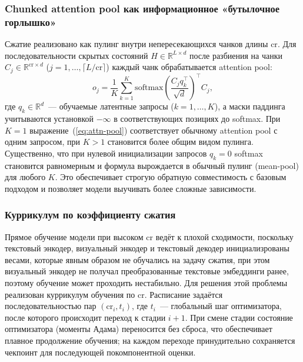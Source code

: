 \documentclass[a4paper,12pt]{extarticle}
\begin{document}
\subsubsection{Chunked attention pool как информационное «бутылочное горлышко»}\label{sec:method-pool}

Сжатие реализовано как пулинг внутри непересекающихся чанков длины $\text{cr}$. Для последовательности скрытых состояний $H \in \mathbb{R}^{L \times d}$ после разбиения на чанки $C_j \in \mathbb{R}^{\text{cr} \times d}$ ($j = 1, \dots, \lceil L/\text{cr} \rceil$) каждый чанк обрабатывается attention pool:
\begin{equation}
    \label{eq:attn-pool}
    o_j = \frac{1}{K} \sum_{k=1}^{K} \mathrm{softmax}\!\left( \frac{C_j q_k^\top}{\sqrt{d}} \right)^\top C_j,
\end{equation}
где $q_k \in \mathbb{R}^{d}$~--- обучаемые латентные запросы ($k = 1, \dots, K$), а маски паддинга учитываются установкой $-\infty$ в соответствующих позициях до softmax. При $K = 1$ выражение~(\ref{eq:attn-pool}) соответствует обычному attention pool с одним запросом, при $K > 1$ становится более общим видом пулинга. Существенно, что при нулевой инициализации запросов $q_k = 0$ softmax становится равномерным и формула вырождается в обычный пулинг (mean-pool) для любого $K$. Это обеспечивает строгую обратную совместимость с базовым подходом и позволяет модели выучивать более сложные зависимости.

\subsubsection{Куррикулум по коэффициенту сжатия}\label{sec:method-curriculum}

Прямое обучение модели при высоком $\text{cr}$ ведёт к плохой сходимости, поскольку текстовый энкодер, визуальный энкодер и текстовый декодер инициализрованы весами, которые явным образом не обучались на задачу сжатия, при этом визуальный энкодер не получал преобразованные текстовые эмбеддинги ранее, поэтому обучение может проходить нестабильно. Для решения этой проблемы реализован куррикулум обучения по $\text{cr}$. Расписание задаётся последовательностью пар $(\text{cr}_i, t_i)$, где $t_i$~--- глобальный шаг оптимизатора, после которого происходит переход к стадии $i+1$. При смене стадии состояние оптимизатора (моменты Адама) переносится без сброса, что обеспечивает плавное продолжение обучения; на каждом переходе принудительно сохраняется чекпоинт для последующей покомпонентной оценки.
\end{document}
